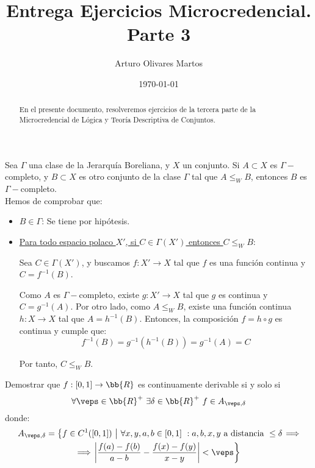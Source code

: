 \documentclass[12pt]{article}
\author{Arturo Olivares Martos}
\date{\today}
\title{Entrega Ejercicios Microcredencial. Parte 3}
\begin{document}
    \maketitle
    \begin{abstract}
        En el presente documento, resolveremos ejercicios de la tercera parte de la Microcredencial de Lógica y Teoría Descriptiva de Conjuntos.
    \end{abstract}

    \begin{ejercicio}
        Sea $\Gamma$ una clase de la Jerarquía Boreliana, y $X$ un conjunto. Si $A\subset X$ es $\Gamma-$completo, y $B\subset X$ es otro conjunto de la clase $\Gamma$ tal que $A\leq_W B$, entonces $B$ es $\Gamma-$completo.\\

        Hemos de comprobar que:
        \begin{itemize}
            \item \ul{$B\in \Gamma$}: Se tiene por hipótesis.
            \item \ul{Para todo espacio polaco $X'$, si $C\in \Gamma(X')$ entonces $C\leq_W B$}:
            
            Sea $C\in \Gamma(X')$, y buscamos $f:X'\to X$ tal que $f$ es una función continua y $C=f^{-1}(B)$.
            
            Como $A$ es $\Gamma-$completo, existe $g:X'\to X$ tal que $g$ es continua y $C=g^{-1}(A)$. Por otro lado, como $A\leq_W B$, existe una función continua $h:X\to X$ tal que $A=h^{-1}(B)$. Entonces, la composición $f=h\circ g$ es continua y cumple que:
            \begin{equation*}
                f^{-1}(B) = g^{-1}(h^{-1}(B)) = g^{-1}(A) = C
            \end{equation*}

            Por tanto, $C\leq_W B$.
        \end{itemize}
    \end{ejercicio}


    \begin{ejercicio}
        Demostrar que $f:[0,1]\to \bb{R}$ es continuamente derivable si y solo si
        \begin{equation*}
            \forall\veps\in \bb{R}^+\ \exists\delta\in \bb{R}^+\ f\in A_{\veps,\delta}
        \end{equation*}
        donde:
        \begin{multline*}
            A_{\veps,\delta} = \left\{f\in C^1([0,1])\ \middle|\ \forall x,y,a,b\in [0,1]\ : a,b,x,y \text{ a distancia } \leq \delta\right. \Longrightarrow \\\Longrightarrow \left.\left|\frac{f(a)-f(b)}{a-b} - \frac{f(x)-f(y)}{x-y}\right| < \veps\right\}
        \end{multline*}
    \end{ejercicio}
\end{document}
